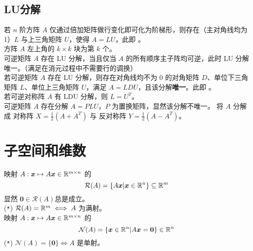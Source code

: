\documentclass[./main.tex]{subfiles}
\begin{document}
\subsection{LU分解}
若 $n$ 阶方阵 $A$ 仅通过倍加矩阵做行变化即可化为阶梯形，则存在（主对角线均为1）$L$ 与上三角矩阵 $U$，使得 $A=LU$，此即 。\\
方阵 $A$ 左上角的 $k\times k$ 块为第 $k$ 个。\\
可逆矩阵 $A$ 存在 LU 分解，当且仅当 $A$ 的所有顺序主子阵均可逆，此时 LU 分解唯一。（满足在消元过程中不需要行的调换）\\
若可逆矩阵 $A$ 存在 LU 分解，则存在对角线均不为 0 的对角矩阵 $D$、单位下三角矩阵 $L$、单位上三角矩阵 $U$，满足 $A=LDU$，且该分解\textbf{唯一}。此即 。\\
若可逆对称阵 $A$ 有 LDU 分解，则 $L=U^T$。\\
可逆矩阵 $A$ 存在分解 $A=PLU$，$P$ 为置换矩阵，显然该分解不唯一。
将 $A$ 分解成 对称阵 $X=\frac{1}{2}(A+A^T)$ 与 反对称阵 $Y=\frac{1}{2}(A-A^T)$。
\section{子空间和维数}
映射 $A:\bm{x}\mapsto A\bm{x}\in\mathbb{R}^{m\times n}$ 的
\begin{equation}
    \mathcal{R}(A)=\{A\bm{x}|\bm{x}\in\mathbb{R}^{n}\}\subseteq\mathbb{R}^{m}
\end{equation}
显然 $\bm{0}\in\mathcal{R}(A)$总是成立。\\
(\texttt{*}) $\mathcal{R}(A)=\mathbb{R}^{m}\iff A$ 为满射。\\
映射 $A:\bm{x}\mapsto A\bm{x}\in\mathbb{R}^{m\times n}$ 的
\begin{equation}
\mathcal{N}(A)=\{\bm{x}\in\mathbb{R}^{n}|A\bm{x}=\bm{0}\}\in\mathbb{R}^{n}
\end{equation}
(\texttt{*}) $\mathcal{N}(A)=\{\bm{0}\}\iff A$ 是单射。
\tinysec{}
\end{document}

